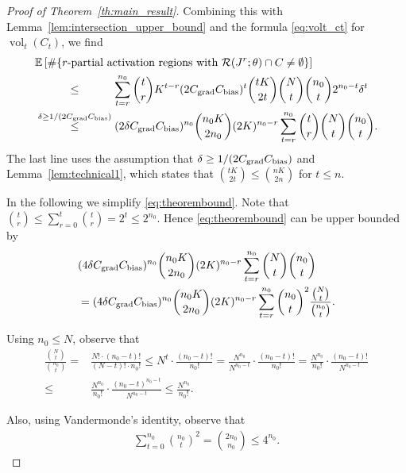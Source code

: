 \documentclass{article}
\theoremstyle{definition}
\newcommand{\cbias}{C_{\text{\normalfont bias}}}
\newcommand{\cgrad}{C_{\text{\normalfont grad}}}
\newcommand{\nin}{n_0}
\newcommand{\vol}{\operatorname{vol}}
\begin{document}
\begin{proof}[Proof of Theorem~\ref{th:main_result}]
    Combining this with Lemma~\ref{lem:intersection_upper_bound} and the formula \eqref{eq:volt_ct} for $\vol_t(C_t)$, we find
    \begin{align}
        &\mathbb{E} \left[  \# \{ r\text{\normalfont -partial activation regions with } \mathcal{R}(J^r;\theta) \cap C \neq \emptyset\} \right]\nonumber \\
        &\stackrel{\phantom {\delta \geq 1 / (2 \cgrad \cbias)}}{\leq} \sum\limits_{t = r}^{\nin} \binom{t}{r} K^{t-r} (2 \cgrad \cbias)^t \binom{tK}{2t} \binom{N}{t} \binom{\nin}{t} 2^{\nin - t} \delta^t \nonumber\\
        & \stackrel{\delta \geq 1 / (2 \cgrad \cbias)}{\leq} (2 \delta \cgrad \cbias)^{\nin} \binom{\nin K}{2 \nin} (2 K) ^{\nin - r} \sum\limits_{t = r}^{\nin} \binom{t}{r} \binom{N}{t} \binom{\nin}{t}.
        \label{eq:theorembound}
    \end{align}
    The last line uses the assumption that $\delta \geq 1 / (2 \cgrad \cbias)$ and Lemma~\ref{lem:technical1}, which states that $\binom{tK}{2t} \leq \binom{nK}{2n}$ for $t\leq n$. 

    In the following we simplify \eqref{eq:theorembound}. 
    Note that $\binom{t}{r} \leq \sum_{r = 0}^{t} \binom{t}{r} = 2^{t} \leq 2^{\nin}$.
    Hence \eqref{eq:theorembound} can be upper bounded by 
    \begin{align*}
        &(4 \delta \cgrad \cbias )^{\nin} \binom{\nin K}{2 \nin}  (2 K) ^{\nin - r} \sum\limits_{t = r}^{\nin} \binom{N}{t} \binom{\nin}{t}\\
        &= (4 \delta \cgrad \cbias)^{\nin} \binom{\nin K}{2 \nin}  (2 K) ^{\nin - r} \sum\limits_{t = r}^{\nin} \binom{\nin}{t}^2 \frac{ \binom{N}{t} }{\binom{\nin}{t}}.
    \end{align*}
    
    Using $\nin \leq N$, observe that 
    \begin{align*}
        \frac{ \binom{N}{t} }{\binom{\nin}{t}} = &\frac{N! \cdot (\nin - t)!}{(N - t)! \cdot \nin!} \leq N^{t} \cdot \frac{(\nin - t)!}{\nin!} = \frac{N^{\nin}}{N^{\nin - t}} \cdot \frac{(\nin - t)!}{\nin!} = \frac{N^{\nin}}{\nin!} \cdot \frac{(\nin - t)!}{N^{\nin - t}}\\
        \leq &\frac{N^{\nin}}{\nin!} \cdot \frac{(\nin - t)^{\nin - t}}{N^{\nin - t}} \leq \frac{N^{\nin}}{\nin!}.
    \end{align*}
    
    Also, using Vandermonde's identity, observe that 
    \begin{align*}
        \sum\limits_{t = 0}^{\nin} \binom{\nin}{t}^2 =\binom {2 \nin}{ \nin} \leq 4^{\nin}.
    \end{align*}
    

\end{proof}
\end{document}
